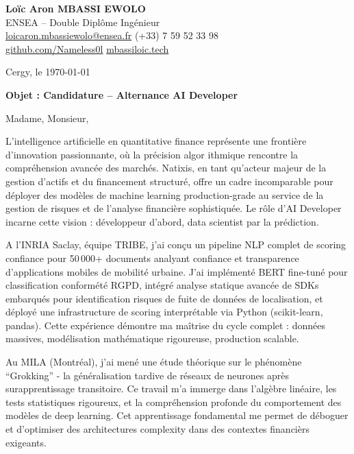 \documentclass[a4paper,11pt]{article}
\begin{document}
\noindent
\textbf{Lo\"ic Aron MBASSI EWOLO} \\
ENSEA -- Double Dipl\^ome Ing\'enieur \\
\href{mailto:loicaron.mbassiewolo@ensea.fr}{loicaron.mbassiewolo@ensea.fr} \quad (+33) 7 59 52 33 98 \\
\href{https://github.com/Nameless0l}{github.com/Nameless0l} \quad \href{https://mbassiloic.tech}{mbassiloic.tech}

\vspace{1em}
\noindent Cergy, le \today

\vspace{1em}
\noindent \textbf{Objet : Candidature -- Alternance AI Developer}

\vspace{1.5em}
\noindent Madame, Monsieur,

\vspace{0.8em}
\noindent L'intelligence artificielle en quantitative finance repr\'esente une fronti\`ere d'innovation passionnante, o\`u la pr\'ecision algor ithmique rencontre la compr\'ehension avanc\'ee des march\'es. Natixis, en tant qu'acteur majeur de la gestion d'actifs et du financement structur\'e, offre un cadre incomparable pour d\'eployer des mod\`eles de machine learning production-grade au service de la gestion de risques et de l'analyse financi\`ere sophistiqu\'ee. Le r\^ole d'AI Developer incarne cette vision : d\'eveloppeur d'abord, data scientist par la pr\'ediction.

\vspace{0.8em}
\noindent A l'INRIA Saclay, \'equipe TRIBE, j'ai con\c{c}u un pipeline NLP complet de scoring confiance pour 50\,000+ documents analyant confiance et transparence d'applications mobiles de mobilit\'e urbaine. J'ai impl\'ement\'e BERT fine-tun\'e pour classification conform\'et\'e RGPD, int\'egr\'e analyse statique avanc\'ee de SDKs embarqu\'es pour identification risques de fuite de donn\'ees de localisation, et d\'eploy\'e une infrastructure de scoring interpr\'etable via Python (scikit-learn, pandas). Cette exp\'erience d\'emontre ma ma\^itrise du cycle complet : donn\'ees massives, mod\'elisation math\'ematique rigoureuse, production scalable.

\vspace{0.8em}
\noindent Au MILA (Montr\'eal), j'ai men\'e une \'etude th\'eorique sur le ph\'enom\`ene ``Grokking'' - la g\'en\'eralisation tardive de r\'eseaux de neurones apr\`es surapprentissage transitoire. Ce travail m'a immerge dans l'algèbre lin\'eaire, les tests statistiques rigoureux, et la compr\'ehension profonde du comportement des mod\`eles de deep learning. Cet apprentissage fondamental me permet de d\'eboguer et d'optimiser des architectures complexity dans des contextes financi\`ers exigeants.
\end{document}
